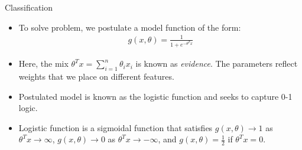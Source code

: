 \documentclass[9pt]{beamer}
\begin{document}
\begin{frame}{Classification}


\begin{itemize}
\item To solve problem, we postulate a model function of the form:
\begin{align*}
g(x,\theta)=\frac{1}{1+e^{-\theta^Tx}}
\end{align*}
 
\item Here, the mix $\theta^Tx=\sum_{i=1}^n\theta_ix_i$ is known as {\em evidence}. The parameters reflect weights that we place on different features. 

\item Postulated model is known as the logistic function and seeks to capture 0-1 logic. 
\item Logistic function is a sigmoidal function that satisfies $g(x,\theta)\to 1$ as $\theta^Tx\to \infty$, $g(x,\theta)\to 0$ as $\theta^Tx\to -\infty$,  and $g(x,\theta)=\frac{1}{2}$ if $\theta^Tx=0$. 

\end{itemize}

\end{frame}

\end{document}
